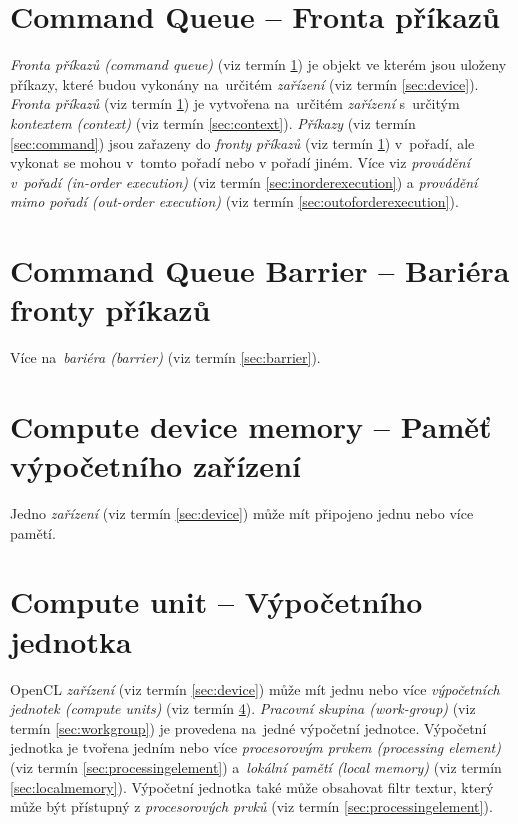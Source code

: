 \section{Command Queue -- Fronta příkazů}
\label{sec:commandqueue}
\emph{Fronta příkazů (command queue)} (viz termín \ref{sec:commandqueue}) je objekt ve kterém jsou uloženy příkazy,
které budou vykonány na~určitém \emph{zařízení} (viz termín \ref{sec:device}). \emph{Fronta příkazů} (viz termín \ref{sec:commandqueue}) je vytvořena 
na~určitém \emph{zařízení} s~určitým \emph{kontextem (context)} (viz termín \ref{sec:context}). \emph{Příkazy} (viz termín \ref{sec:command}) jsou zařazeny
do \emph{fronty příkazů} (viz termín \ref{sec:commandqueue})  v~pořadí, ale vykonat se mohou v~tomto pořadí nebo
v pořadí jiném. Více viz \emph{provádění v~pořadí (in-order execution)} (viz termín \ref{sec:inorderexecution})  a
\emph{provádění mimo pořadí (out-order execution)} (viz termín \ref{sec:outoforderexecution}).


\section{Command Queue Barrier -- Bariéra fronty příkazů}
\label{sec:commandqueuebarrier}

Více na~\emph{bariéra (barrier)}  (viz termín \ref{sec:barrier}).


\section{Compute device memory -- Paměť výpočetního zařízení}
\label{sec:computedevicememory}

Jedno \emph{zařízení} (viz termín \ref{sec:device}) může mít připojeno jednu nebo více pamětí.

\section{Compute unit -- Výpočetního jednotka}
\label{sec:computeunit}

OpenCL \emph{zařízení} (viz termín \ref{sec:device}) může mít jednu nebo více \emph{výpočetních jednotek (compute units)} (viz termín \ref{sec:computeunit}). \emph{Pracovní skupina (work-group)} (viz termín \ref{sec:workgroup}) je provedena na~jedné výpočetní jednotce. Výpočetní jednotka je tvořena jedním nebo více \emph{procesorovým prvkem 
(processing element)} (viz termín \ref{sec:processingelement}) a~\emph{lokální pamětí (local memory)} (viz termín \ref{sec:localmemory}). Výpočetní jednotka
také může obsahovat filtr textur, který může být přístupný z  \emph{procesorových prvků} (viz termín \ref{sec:processingelement}).


